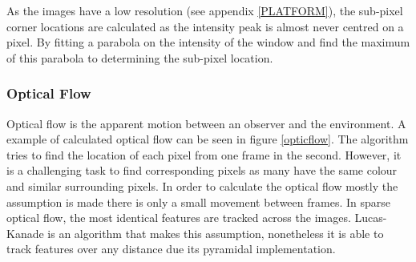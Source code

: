 \documentclass[a4paper]{article}
\begin{document}
As the images have a low resolution (see appendix \ref{PLATFORM}), the sub-pixel corner locations are calculated as the intensity peak is almost never centred on a pixel. By fitting a parabola on the intensity of the window and find the maximum of this parabola to determining the sub-pixel location.

\subsubsection{Optical Flow}
Optical flow is the apparent motion between an observer and the environment. A example of calculated optical flow can be seen in figure \ref{opticflow}. The algorithm tries to find the location of each pixel from one frame in the second. However, it is a challenging task to find corresponding pixels as many have the same colour and similar surrounding pixels. In order to calculate the optical flow mostly the assumption is made there is only a small movement between frames. In sparse optical flow, the most identical features are tracked across the images. Lucas-Kanade is an algorithm that makes this assumption, nonetheless it is able to track features over any distance due its pyramidal implementation.\\
\end{document}
